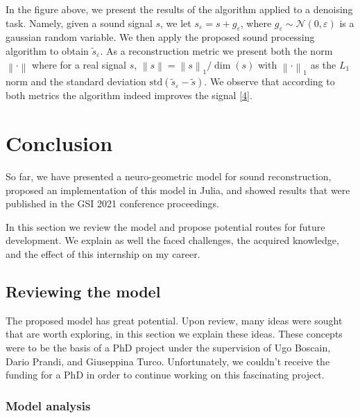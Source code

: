 \documentclass[
  american,
]{article}
\begin{document}
In the figure above, we present the results of the algorithm applied to a denoising task.
Namely, given a sound signal \(s\), we let \(s_\varepsilon= s + g_\varepsilon\),
where \(g_\varepsilon\sim \mathcal N(0,\varepsilon)\) is a gaussian random variable.
We then apply the proposed sound processing algorithm to obtain \(\tilde s_\varepsilon\).
As a reconstruction metric we present both the norm \(\left\lVert\cdot\right\rVert\)
where for a real signal \(s\), \(\left\lVert s\right\rVert = \left\lVert s\right\rVert_1/\dim(s)\)
with \(\left\lVert\cdot\right\rVert_1\) as the \(L_1\) norm
and the standard deviation \(\mathrm{std}(\tilde s_\varepsilon -\tilde s)\).
We observe that according to both metrics the algorithm indeed improves the signal {[}\protect\hyperlink{ref-asswad2021}{4}{]}.

\pagebreak

\hypertarget{conclusion}{%
\section{Conclusion}\label{conclusion}}

So far, we have presented a neuro-geometric model for sound reconstruction,
proposed an implementation of this model in Julia,
and showed results that were published in the GSI 2021 conference proceedings.

In this section we review the model and propose potential
routes for future development.
We explain as well the faced challenges, the acquired knowledge,
and the effect of this internship on my career.

\hypertarget{reviewing-the-model}{%
\subsection{Reviewing the model}\label{reviewing-the-model}}

The proposed model has great potential.
Upon review, many ideas were sought that are worth exploring,
in this section we explain these ideas.
These concepts were to be the basis of a PhD project
under the supervision of Ugo Boscain, Dario Prandi, and Giuseppina Turco.
Unfortunately, we couldn't receive the funding for a PhD
in order to continue working on this fascinating project.

\hypertarget{model-analysis}{%
\subsubsection{Model analysis}\label{model-analysis}}
\end{document}

